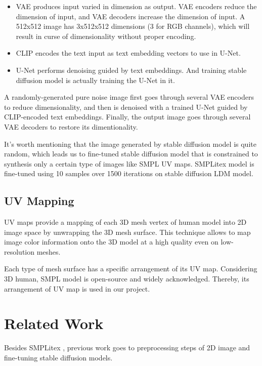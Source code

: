 \documentclass[acmtog]{acmart}
\begin{document}
\begin{itemize}
  \item VAE produces input varied in dimension as output. VAE encoders reduce the dimension of input, and VAE decoders increase the dimension of input. A 512x512 image has 3x512x512 dimensions (3 for RGB channels), which will result in curse of dimensionality without proper encoding.
  \item CLIP encodes the text input as text embedding vectors to use in U-Net.
  \item U-Net performs denoising guided by text embeddings. And training stable diffusion model is actually training the U-Net in it.
\end{itemize}

A randomly-generated pure noise image first goes through several VAE encoders to reduce dimensionality, and then is denoised with a trained U-Net guided by CLIP-encoded text embeddings. Finally, the output image goes through several VAE decoders to restore its dimentionality.

It's worth mentioning that the image generated by stable diffusion model is quite random, which leads us to fine-tuned stable diffusion model \cite{ruiz2023dreambooth} that is constrained to synthesis only a certain type of images like SMPL UV maps. SMPLitex model is fine-tuned using 10 samples over 1500 iterations on stable diffusion LDM model.

\subsection{UV Mapping}

UV maps provide a mapping of each 3D mesh vertex of human model into 2D image space by unwrapping the 3D mesh surface. This technique allows to map image color information onto the 3D model at a high quality even on low-resolution meshes.

Each type of mesh surface has a specific arrangement of its UV map. Considering 3D human, SMPL model is open-source and widely acknowledged. Thereby, its arrangement of UV map is used in our project.

\section{Related Work}
Besides SMPLitex \cite{casas2023smplitex}, previous work goes to preprocessing steps of 2D image and fine-tuning stable diffusion models.
\end{document}
